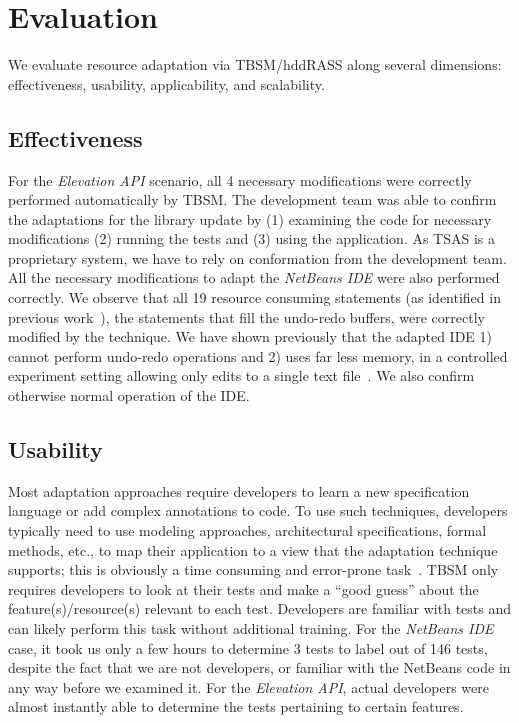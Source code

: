 \section{Evaluation}
We evaluate resource adaptation via TBSM/hddRASS along several dimensions: effectiveness, usability, applicability, and scalability.

\subsection{Effectiveness}
For the \textit{Elevation API} scenario, all 4 necessary modifications were correctly performed automatically by TBSM. The development team was able to confirm the adaptations for the library update by (1) examining the code for necessary modifications (2) running the tests and (3) using the application. As TSAS is a proprietary system, we have to rely on conformation from the development team. All the necessary modifications to adapt the \textit{NetBeans IDE} were also performed correctly. We observe that all 19 resource consuming statements (as identified in previous work~\cite{christi2018qrs}), the statements that fill the undo-redo buffers, were correctly modified by the technique. We have shown previously that the adapted IDE 1) cannot perform undo-redo operations and 2) uses far less memory, in a controlled experiment setting allowing only edits to a single text file~\cite{christi2017saso}. We also confirm otherwise normal operation of the IDE.

\subsection{Usability}
Most adaptation approaches require developers to learn a new specification language or add complex annotations to code. To use such techniques, developers typically need to use modeling approaches, architectural specifications, formal methods, etc., to map their application to a view that the adaptation technique supports; this is obviously a time consuming and error-prone task~\cite{salehie2009selfadaptive, krupitzer2015a}. TBSM only requires developers to look at their tests and make a ``good guess'' about the feature(s)/resource(s) relevant to each test. Developers are familiar with tests and can likely perform this task without additional training. For the \textit{NetBeans IDE} case, it took us only a few hours to determine 3 tests to label out of 146 tests, despite the fact that we are not developers, or familiar with the NetBeans code in any way before we examined it. For the \textit{Elevation API}, actual developers were almost instantly able to determine the tests pertaining to certain features.

